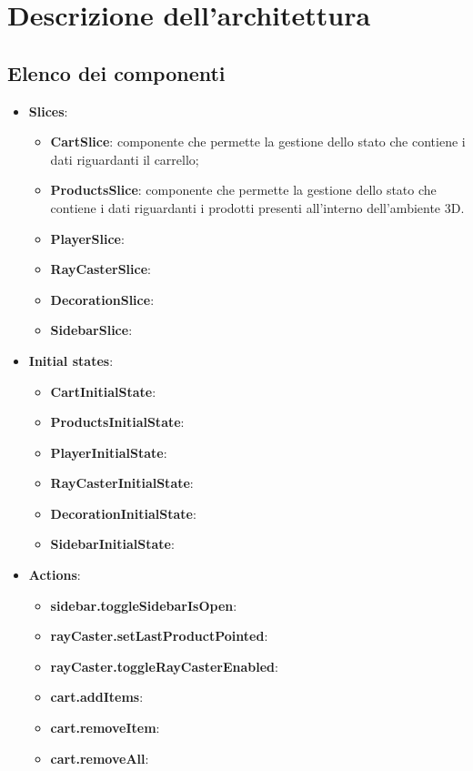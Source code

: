 \section{Descrizione dell'architettura}
\subsection{Elenco dei componenti}
\begin{itemize}
	\item \textbf{\large Slices}:
		\begin{itemize}
			\item \textbf{CartSlice}: componente che permette la gestione dello stato che contiene i dati riguardanti il carrello;
			\item \textbf{ProductsSlice}: componente che permette la gestione dello stato che contiene i dati riguardanti i prodotti 
			presenti all'interno dell'ambiente 3D.
			\item \textbf{PlayerSlice}:
			\item \textbf{RayCasterSlice}:
			\item \textbf{DecorationSlice}: 
			\item \textbf{SidebarSlice}:
		\end{itemize}
	\item \textbf{\large Initial states}:
		\begin{itemize}
			\item \textbf{CartInitialState}:
			\item \textbf{ProductsInitialState}:
			\item \textbf{PlayerInitialState}:
			\item \textbf{RayCasterInitialState}:
			\item \textbf{DecorationInitialState}:
			\item \textbf{SidebarInitialState}:
		\end{itemize}
		\item \textbf{\large Actions}:
		\begin{itemize}
			\item \textbf{sidebar.toggleSidebarIsOpen}:
			\item \textbf{rayCaster.setLastProductPointed}:
			\item \textbf{rayCaster.toggleRayCasterEnabled}:
			\item \textbf{cart.addItems}:
			\item \textbf{cart.removeItem}:
			\item \textbf{cart.removeAll}: 
		\end{itemize}

\end{itemize}
